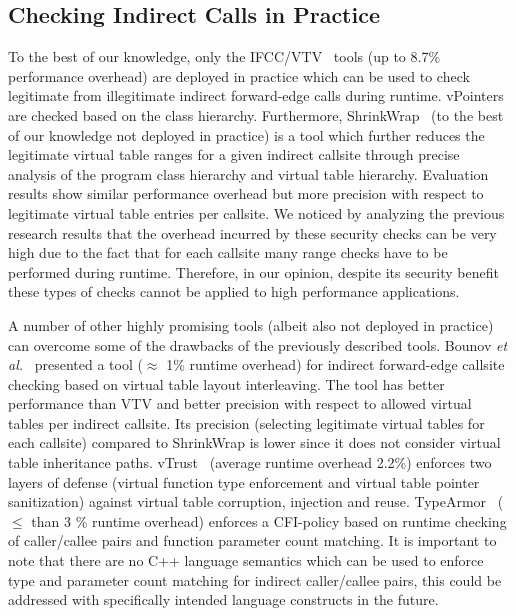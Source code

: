 \subsection{Checking Indirect Calls in Practice}
\label{C++ Indirect Calls in Practice}
To the best of our knowledge, only the IFCC/VTV~\cite{vtv:tice} tools (up to 8.7\% performance overhead) are deployed in practice
which can be used to check legitimate from illegitimate indirect forward-edge calls during runtime. vPointers are checked based on the class hierarchy. 
Furthermore, ShrinkWrap~\cite{haller:shrinkwrap} (to the best of our knowledge not deployed in practice) is a tool which further reduces the legitimate 
virtual table ranges for a given indirect callsite through precise analysis of the program class hierarchy and virtual table hierarchy. Evaluation results
show similar performance overhead but more precision with respect to legitimate virtual table entries per callsite. We noticed by analyzing the previous 
research results that the overhead incurred by these security checks can be very high due to the fact that for each callsite many range checks have to be
performed during runtime. Therefore, in our opinion, despite its security benefit these types of checks cannot be applied to high performance applications.

A number of other highly promising tools (albeit also not deployed in practice) can overcome some of the drawbacks of the previously described tools. 
Bounov \textit{et al.}~\cite{bounov:interleaving} presented a tool ($\approx$ 1\% runtime overhead)
for indirect forward-edge callsite checking based on virtual table layout interleaving. The tool has better performance than VTV and better precision with
respect to allowed virtual tables per indirect callsite. Its precision (selecting legitimate virtual tables for each callsite) compared to ShrinkWrap is
lower since it does not consider virtual table inheritance paths. vTrust~\cite{zhang:vtrust} (average runtime overhead 2.2\%) enforces two layers of defense
(virtual function type enforcement and virtual table pointer sanitization) against virtual table corruption, injection and reuse. TypeArmor~\cite{veen:typearmor}
($\le$ than 3 \% runtime overhead) enforces a CFI-policy based on runtime checking of caller/callee pairs and function parameter count matching. It is important to note 
that there are no C++ language semantics which can be used to enforce type and parameter count matching for indirect caller/callee pairs, this could be addressed
with specifically intended language constructs in the future.

